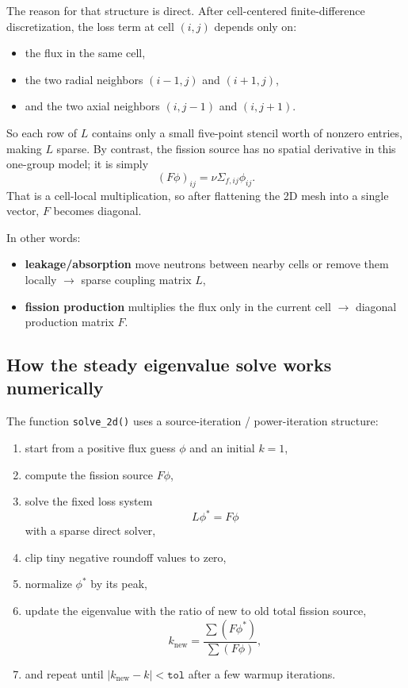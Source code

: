 \documentclass[11pt]{article}
\begin{document}
The reason for that structure is direct.  After cell-centered finite-difference
discretization, the loss term at cell $(i,j)$ depends only on:
\begin{itemize}
  \item the flux in the same cell,
  \item the two radial neighbors $(i-1,j)$ and $(i+1,j)$,
  \item and the two axial neighbors $(i,j-1)$ and $(i,j+1)$.
\end{itemize}

So each row of $L$ contains only a small five-point stencil worth of nonzero
entries, making $L$ sparse.  By contrast, the fission source has no spatial
derivative in this one-group model; it is simply
\[
\left(F\phi\right)_{ij} = \nu\Sigma_{f,ij}\phi_{ij}.
\]
That is a cell-local multiplication, so after flattening the 2D mesh into a
single vector, $F$ becomes diagonal.

In other words:
\begin{itemize}
  \item \textbf{leakage/absorption} move neutrons between nearby cells or remove
        them locally $\rightarrow$ sparse coupling matrix $L$,
  \item \textbf{fission production} multiplies the flux only in the current cell
        $\rightarrow$ diagonal production matrix $F$.
\end{itemize}

\subsection{How the steady eigenvalue solve works numerically}

The function \texttt{solve\_2d()} uses a source-iteration / power-iteration
structure:
\begin{enumerate}
  \item start from a positive flux guess $\phi$ and an initial $k=1$,
  \item compute the fission source $F\phi$,
  \item solve the fixed loss system
        \[
        L\phi^{*} = F\phi
        \]
        with a sparse direct solver,
  \item clip tiny negative roundoff values to zero,
  \item normalize $\phi^{*}$ by its peak,
  \item update the eigenvalue with the ratio of new to old total fission source,
        \[
        k_{\mathrm{new}} = \frac{\sum(F\phi^{*})}{\sum(F\phi)},
        \]
  \item and repeat until $|k_{\mathrm{new}}-k| < \texttt{tol}$ after a few warmup
        iterations.
\end{enumerate}
\end{document}
